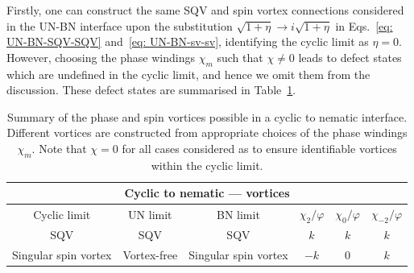 Firstly, one can construct the same SQV and spin vortex connections considered
in the UN-BN interface upon the substitution \(\sqrt{1+\eta} \rightarrow
i\sqrt{1+\eta}\) in Eqs.~\eqref{eq: UN-BN-SQV-SQV} and~\eqref{eq: UN-BN-sv-sv},
identifying the cyclic limit as \(\eta = 0\).
However, choosing the phase windings \(\chi_m\) such that \(\chi \neq 0\) leads
to defect states which are undefined in the cyclic limit, and hence we omit
them from the discussion.
These defect states are summarised in Table~\ref{tab: C-N-vortices}.
\begin{table}
    \centering
    \begin{tabular}{cccccc}
        \toprule
        \multicolumn{6}{c}{Cyclic to nematic --- vortices} \\
        \midrule
        Cyclic limit & UN limit & BN limit & \(\chi_2/\varphi \) &
        \(\chi_0/\varphi \) & \(\chi_{-2}/\varphi \) \\
        \midrule
            SQV & SQV & SQV & \(k\) & \(k\) & \(k\) \\
            Singular spin vortex & Vortex-free & Singular spin vortex & \(-k\)
            & 0 & \(k\) \\
        \bottomrule
    \end{tabular}
    \caption{\label{tab: C-N-vortices}Summary of the phase and spin vortices
    possible in a cyclic to nematic interface.
    Different vortices are constructed from appropriate choices of the phase
    windings \(\chi_m\).
    Note that \(\chi=0\) for all cases considered as to
    ensure identifiable vortices within the cyclic limit.}
\end{table}

